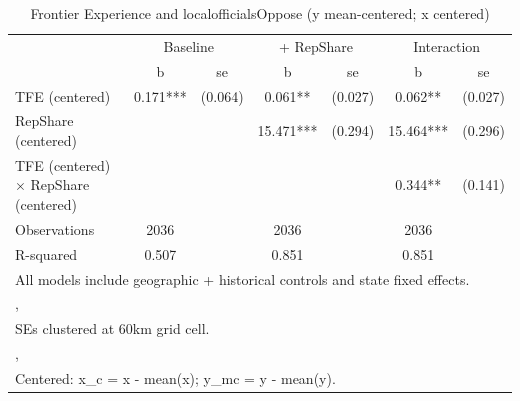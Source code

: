 \begin{table}[htbp]\centering
\def\sym#1{\ifmmode^{#1}\else\(^{#1}\)\fi}
\caption{Frontier Experience and localofficialsOppose (y mean-centered; x centered)}
\begin{tabular}{l*{3}{cc}}
\toprule
                &\multicolumn{2}{c}{Baseline}&\multicolumn{2}{c}{ + RepShare}&\multicolumn{2}{c}{Interaction}\\
                &        b   &       se&        b   &       se&        b   &       se\\
\midrule
TFE (centered)  &    0.171***&  (0.064)&    0.061** &  (0.027)&    0.062** &  (0.027)\\
RepShare (centered)&            &         &   15.471***&  (0.294)&   15.464***&  (0.296)\\
TFE (centered) $\times$ RepShare (centered)&            &         &            &         &    0.344** &  (0.141)\\
\midrule
Observations    &     2036   &         &     2036   &         &     2036   &         \\
R-squared       &    0.507   &         &    0.851   &         &    0.851   &         \\
\bottomrule
\multicolumn{7}{l}{\footnotesize All models include geographic + historical controls and state fixed effects.}\\
\multicolumn{7}{l}{\footnotesize ,}\\
\multicolumn{7}{l}{\footnotesize SEs clustered at 60km grid cell.}\\
\multicolumn{7}{l}{\footnotesize ,}\\
\multicolumn{7}{l}{\footnotesize Centered: x\_c = x - mean(x); y\_mc = y - mean(y).}\\
\end{tabular}
\end{table}
